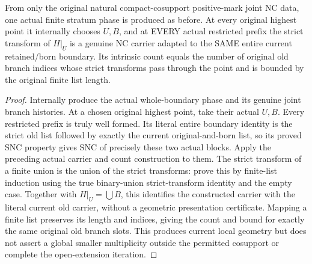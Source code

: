 \begin{theorem}
\label{hir:nc-original-boundary-phase-current-local-adapted-carriers}
\leanok
From only the original natural compact-cosupport positive-mark joint NC data,
one actual finite stratum phase is produced as before. At every original
highest point it internally chooses $U,B$, and at EVERY actual restricted
prefix the strict transform of $H|_U$ is a genuine NC carrier adapted to the
SAME entire current retained/born boundary. Its intrinsic count equals the
number of original old branch indices whose strict transforms pass through
the point and is bounded by the original finite list length.
\end{theorem}
\begin{proof}
Internally produce the actual whole-boundary phase and its genuine joint
branch histories. At a chosen original highest point, take their actual
$U,B$. Every restricted prefix is truly well formed. Its literal entire
boundary identity is the strict old list followed by exactly the current
original-and-born list, so its proved SNC property gives SNC of precisely
these two actual blocks. Apply the preceding actual carrier and count
construction to them. The strict transform of a finite union is the union
of the strict transforms: prove this by finite-list induction using the
true binary-union strict-transform identity and the empty case. Together
with $H|_U=\bigcup B$, this identifies the constructed carrier with the
literal current old carrier, without a geometric presentation certificate.
Mapping a finite list preserves its length and indices, giving the count
and bound for exactly the same original old branch slots. This produces
current local geometry but does not assert a global smaller multiplicity
outside the permitted cosupport or complete the open-extension iteration.
\end{proof}
